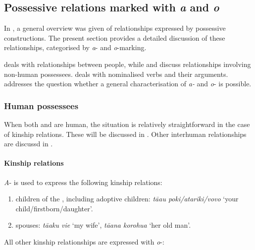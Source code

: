 \subsection{Possessive relations marked with \textit{a} and \textit{o}}\label{sec:6.3.3}

In , a general overview was given of relationships expressed by possessive constructions. The present section provides a detailed discussion of these relationships, categorised by \textit{a}{}- and \textit{o}{}-marking.

 deals with relationships between people, while  and  discuss relationships involving non-human possessees.  deals with nominalised verbs and their arguments.  addresses the question whether a general characterisation of \textit{{\ꞌ}a-} and \textit{o}{}- is possible.

\subsubsection[Human possessees]{Human possessees}\label{sec:6.3.3.1}

When both  and  are human, the situation is relatively straightforward in the case of kinship relations. These will be discussed in . Other interhuman relationships are discussd in .

\paragraph[Kinship relations]{Kinship relations}\label{sec:6.3.3.1.1}
\textit{{\ꞌ}A}- is used to express the following kinship relations:

\begin{enumerate}
\item 
children of the , including adoptive children: \textit{tā{\ꞌ}au poki/{\ꞌ}atariki/vovo} ‘your child/firstborn/daughter’.

\item 
spouses: \textit{tā{\ꞌ}aku vi{\ꞌ}e} ‘my wife’, \textit{tā{\ꞌ}ana korohu{\ꞌ}a} ‘her old man’.

\end{enumerate}

All other kinship relationships are expressed with \textit{o}{}-:

